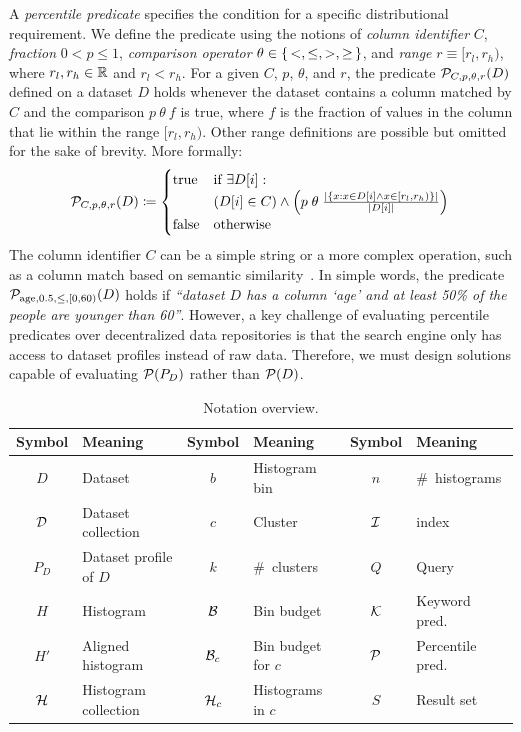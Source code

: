 A \emph{percentile predicate} specifies the condition for a specific distributional requirement.
We define the predicate using the notions of \emph{column identifier} $C$, \emph{fraction} $ 0 < p \leq 1$, \emph{comparison operator} $\theta \in \left\{\,<, \leq, >, \geq\,\right\}$, and \emph{range} $r \equiv [r_l, r_h)$, where $r_l, r_h \in \mathbb{R}$ and $r_l < r_h$.
For a given $C$, $p$, $\theta$, and $r$, the predicate $\mathcal{P}_{C, p, \theta, r}(D)$ defined on a dataset $D$ holds whenever the dataset contains a column matched by $C$ and the comparison $p \: \theta \: f$ is true, where $f$ is the fraction of values in the column that lie within the range $[r_l, r_h)$.
Other range definitions are possible but omitted for the sake of brevity.
More formally:
\[
\mathcal{P}_{C, p, \theta, r}(D) \coloneq
\begin{cases}
    \text{true}   & \text{if } \exists D[i]: \\
            & (D[i] \in C) \land \left(p \; \theta \; \frac{|\{x: x\in D[i] \land x\in [r_l,r_h)\}|}{|D[i]|}\right) \\
    \text{false}  & \text{otherwise}
\end{cases}
\]
The column identifier $C$ can be a simple string or a more complex operation, such as a column match based on semantic similarity~\cite{zhang_ad_2018}.
In simple words, the predicate $\mathcal{P}_{\text{age},0.5,\leq,[0,60)}(D)$ holds if \textit{``dataset $D$ has a column `age' and at least 50\% of the people are younger than 60''}.
However, a key challenge of evaluating percentile predicates over decentralized data repositories is that the search engine only has access to dataset profiles instead of raw data.
Therefore, we must design solutions capable of evaluating $\mathcal{P}(P_D)$ rather than $\mathcal{P}(D)$.


\begin{table}[t]
    \centering
    \footnotesize
    \caption{Notation overview.}
    \label{tab:notation_overview}
    \addtolength{\tabcolsep}{-0.5em}
    \begin{tabular}{cl cl cl}
        \toprule
        Symbol & Meaning                & Symbol  & Meaning            & Symbol & Meaning \\
        \midrule
        $D$    & Dataset                & $b$     & Histogram bin      & $n$    & \#~histograms \\
        $\mathcal{D}$  & Dataset collection     & $c$     & Cluster            & $\mathcal{I}$  & \system{} index \\
        $P_D$  & Dataset profile of $D$ & $k$     & \#~clusters        & $Q$    & Query \\
        $H$    & Histogram              & $\mathcal{B}$   & Bin budget         & $\mathcal{K}$  & Keyword pred. \\
        $H'$   & Aligned histogram      & $\mathcal{B}_c$ & Bin budget for $c$ & $\mathcal{P}$  & Percentile pred. \\
        $\mathcal{H}$  & Histogram collection   & $\mathcal{H}_c$ & Histograms in $c$  & $S$    & Result set \\
        \bottomrule
    \end{tabular}
\end{table}

